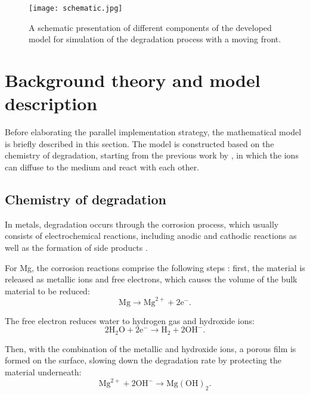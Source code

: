 \begin{figure}[h]
\centering
\medskip
\texttt{[image: schematic.jpg]}
\caption[Schematic presentation of different components of the studied moving boundary problem]{A schematic presentation of different components of the developed model for simulation of the degradation process with a moving front.} \label{fig:schematic}
\end{figure}

\section{Background theory and model description}

Before elaborating the parallel implementation strategy, the mathematical model is briefly described in this section. The model is constructed based on the chemistry of degradation, starting from the previous work by \cite{Bajger2016}, in which the ions can diffuse to the medium and react with each other.


\subsection{Chemistry of degradation}

In metals, degradation occurs through the corrosion process, which usually consists of electrochemical reactions, including anodic and cathodic reactions as well as the formation of side products \cite{Zheng2014}.

For Mg, the corrosion reactions comprise the following steps \cite{Zheng2014}: first, the material is released as metallic ions and free electrons, which causes the volume of the bulk material to be reduced:
\begin{equation} \label{eq:oxidation_react_parallel}
\mathrm{Mg} \longrightarrow \mathrm{Mg}^{2+}+2 \mathrm{e}^{-}.
\end{equation}

The free electron reduces water to hydrogen gas and hydroxide ions:
\begin{equation} \label{eq:reduction_react_parallel}
2 \mathrm{H}_{2} \mathrm{O}+2 \mathrm{e}^{-} \longrightarrow \mathrm{H}_{2}+2 \mathrm{OH}^{-}.
\end{equation}

Then, with the combination of the metallic and hydroxide ions, a porous film is formed on the surface, slowing down the degradation rate by protecting the material underneath:
\begin{equation} \label{eq:formation_react}
\mathrm{Mg}^{2+}+2 \mathrm{OH}^{-} \longrightarrow \mathrm{Mg}(\mathrm{OH})_{2}.
\end{equation}

